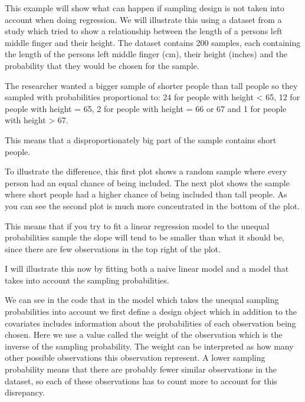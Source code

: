 \documentclass{article}
\begin{document}
\begin{example}

This example will show what can happen if sampling design is not taken
into account when doing regression. We will illustrate this using a dataset from a study which tried to show a relationship between the length of a persons left middle finger and their height. The dataset contains 200 samples, each containing the length of the persons left middle finger (cm), their height (inches) and the probability that they would be chosen for the sample.

The researcher wanted a bigger sample of shorter people than tall people so they sampled with probabilities proportional to: 24 for people with height < 65, 12 for people with height = 65, 2 for people with height = 66 or 67 and 1 for people with height > 67.


This means that a disproportionately big part of the sample contains short people. 

To illustrate the difference, this first plot shows a random sample where every person had an equal chance of being included. The next plot shows the sample where short people had a higher chance of being included than tall people. As you can see the second plot is much more concentrated in the bottom of the plot.



This means that if you try to fit a linear regression model to the unequal probabilities sample the slope will tend to be smaller than what it should be, since there are few observations in the top right of the plot.

I will illustrate this now by fitting both a naive linear model and a model that takes into account the sampling probabilities.



We can see in the code that in the model which takes the unequal sampling probabilities into account we first define a design object which in addition to the covariates includes information about the probabilities of each observation being chosen. Here we use a value called the weight of the observation which is the inverse of the sampling probability. The weight can be interpreted as how many other possible observations this observation represent. A lower sampling probability means that there are probably fewer similar observations in the dataset, so each of these observations has to count more to account for this disrepancy.


\end{example}
\end{document}

